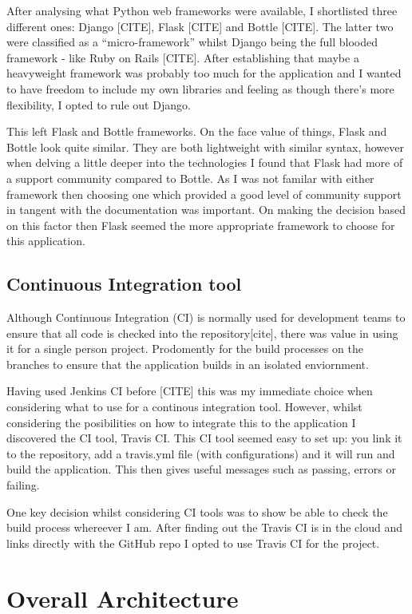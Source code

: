 After analysing what Python web frameworks were available, I shortlisted three different ones: Django [CITE], Flask [CITE] and Bottle [CITE]. The latter two were classified as a  ``micro-framework'' whilst Django being the full blooded framework - like Ruby on Rails [CITE].  After establishing that maybe a heavyweight framework was probably too much for the application and I wanted to have freedom to include my own libraries and feeling as though there's more flexibility, I opted to rule out Django.

This left Flask and Bottle frameworks. On the face value of things, Flask and Bottle look quite similar. They are both lightweight with similar syntax, however when delving a little deeper into the technologies I found that Flask had more of a support community compared to Bottle. As I was not familar with either framework then choosing one which provided a good level of community support in tangent with the documentation was important. On making the decision based on this factor then Flask seemed the more appropriate framework to choose for this application.

\subsection{Continuous Integration tool}
Although Continuous Integration (CI) is normally used for development teams to ensure that all code is checked into the repository[cite], there was value in using it for a single person project. Prodomently for the build processes on the branches to ensure that the application builds in an isolated enviornment.

Having used Jenkins CI before [CITE] this was my immediate choice when considering what to use for a continous integration tool. However, whilst considering the posibilities on how to integrate this to the application I discovered the CI tool, Travis CI. This CI tool seemed easy to set up: you link it to the repository, add a travis.yml file (with configurations) and it will run and build the application. This then gives useful messages such as passing, errors or failing.

One key decision whilst considering CI tools was to show be able to check the build process whereever I am. After finding out the Travis CI is in the cloud and links directly with the GitHub repo I opted to use Travis CI for the project.


\section{Overall Architecture}

